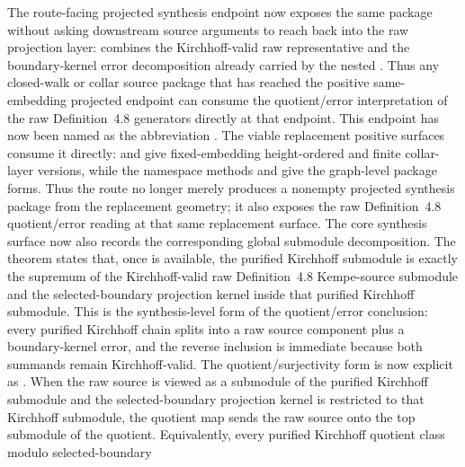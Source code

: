 \documentclass[11pt]{article}
\begin{document}
The route-facing projected synthesis endpoint now exposes the same package
without asking downstream source arguments to reach back into the raw projection
layer:
combines the Kirchhoff-valid raw representative and the boundary-kernel error
decomposition already carried by the nested
.  Thus any closed-walk or collar source
package that has reached the positive same-embedding projected endpoint can
consume the quotient/error interpretation of the raw Definition~4.8
generators directly at that endpoint.
This endpoint has now been named as the abbreviation
.  The viable replacement
positive surfaces consume it directly:
and
give fixed-embedding height-ordered and finite collar-layer versions, while the
namespace methods
and
give the graph-level package forms.  Thus the route no longer merely produces a
nonempty projected synthesis package from the replacement geometry; it also
exposes the raw Definition~4.8 quotient/error reading at that same replacement
surface.
The core synthesis surface now also records the corresponding global submodule
decomposition.  The theorem
states that, once  is available, the
purified Kirchhoff submodule is exactly the supremum of the Kirchhoff-valid raw
Definition~4.8 Kempe-source submodule and the selected-boundary projection
kernel inside that purified Kirchhoff submodule.  This is the synthesis-level
form of the quotient/error conclusion: every purified Kirchhoff chain splits
into a raw source component plus a boundary-kernel error, and the reverse
inclusion is immediate because both summands remain Kirchhoff-valid.
The quotient/surjectivity form is now explicit as
.  When the raw
source is viewed as a submodule of the purified Kirchhoff submodule and the
selected-boundary projection kernel is restricted to that Kirchhoff submodule,
the quotient map sends the raw source onto the top submodule of the quotient.
Equivalently, every purified Kirchhoff quotient class modulo selected-boundary
\end{document}
